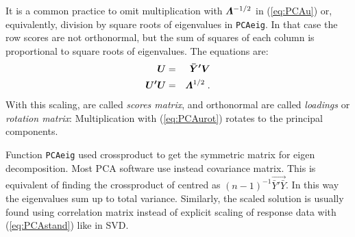 \begin{Schunk}
\end{Schunk}
It is a common practice to omit multiplication with
$\vec{\bLambda}^{-1/2}$ in (\ref{eq:PCAu}) or, equivalently, division
by square roots of eigenvalues in \texttt{PCAeig}. In that case the
row scores  are not orthonormal, but the sum of squares of each
column is proportional to square roots of eigenvalues. The equations
are:
\begin{eqnarray}
  \label{eq:PCAurot}
  \vec{U} &=& \vec{\bar Y' V}\\
  \vec{U'U} &=& \vec{\bLambda}^{1/2} \;.
\end{eqnarray}
With this scaling,  are called \emph{scores matrix}, and
orthonormal  are called \emph{loadings} or \emph{rotation
  matrix}: Multiplication with (\ref{eq:PCAurot}) rotates
 to the principal components.

Function \texttt{PCAeig} used crossproduct  to get
the symmetric matrix for eigen decomposition. Most PCA software use
instead covariance matrix. This is equivalent of finding the
crossproduct of centred  as $ (n-1)^{-1} \vec{\bar Y' \bar Y}$.
In this way the eigenvalues sum up to total
variance. Similarly, the scaled solution is usually found using
correlation matrix instead of explicit scaling of response data with
(\ref{eq:PCAstand}) like in SVD.

